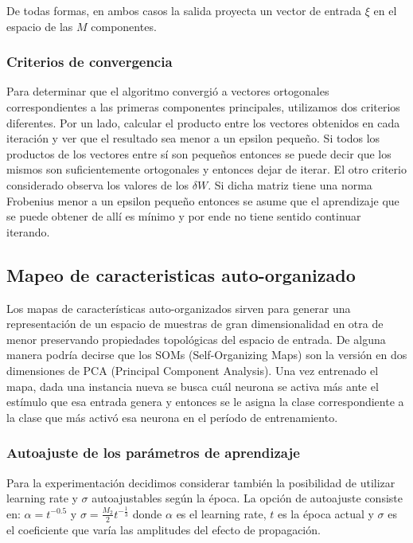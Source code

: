 \documentclass[informe.tex]{subfiles}
\begin{document}
	De todas formas, en ambos casos la salida proyecta un vector de entrada $\xi$ en el espacio de las $M$ componentes.
	
      \subsubsection{Criterios de convergencia}
	Para determinar que el algoritmo convergió a vectores ortogonales correspondientes a las primeras componentes principales, utilizamos dos criterios diferentes. Por un lado, calcular el producto entre los vectores obtenidos en cada iteración y ver que el resultado sea menor a un epsilon pequeño. Si todos los productos de los vectores entre sí son pequeños entonces se puede decir que los mismos son suficientemente ortogonales y entonces dejar de iterar. El otro criterio considerado observa los valores de los $\delta W$. Si dicha matriz tiene una norma Frobenius menor a un epsilon pequeño entonces se asume que el aprendizaje que se puede obtener de allí es mínimo y por ende no tiene sentido continuar iterando.
	
    \subsection{Mapeo de caracteristicas auto-organizado}
	Los mapas de características auto-organizados sirven para generar una representación de un espacio de muestras de gran dimensionalidad en otra de menor preservando propiedades topológicas del espacio de entrada. De alguna manera podr\'ia decirse que los SOMs (Self-Organizing Maps) son la versión en dos dimensiones de PCA (Principal Component Analysis). Una vez entrenado el mapa, dada una instancia nueva se busca cuál neurona se activa más ante el estímulo que esa entrada genera y entonces se le asigna la clase correspondiente a la clase que más activó esa neurona en el período de entrenamiento.
	
	\subsubsection{Autoajuste de los parámetros de aprendizaje}
	  Para la experimentación decidimos considerar también la posibilidad de utilizar learning rate y $\sigma$ autoajustables según la época. La opción de autoajuste consiste en: $\alpha = t^{-0.5}$ y $\sigma = \frac{M_2}{2}t^{-\frac{1}{3}}$ donde $\alpha$ es el learning rate, $t$ es la época actual y $\sigma$ es el coeficiente que varía las amplitudes del efecto de propagación.
\end{document}

